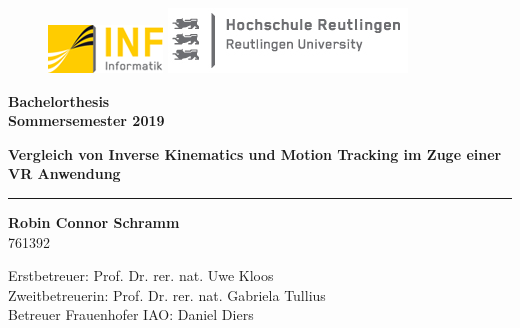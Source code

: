 \begin{titlepage}

\begin{center}

\begin{figure}
\begin{minipage}[H]{4cm}
\centering
\includegraphics[width=0.8\linewidth]{Bilder/Deckblatt/universityLogo}
\end{minipage}
\hfill
\begin{minipage}[H]{6cm}
\centering
\includegraphics[width=1\linewidth]{Bilder/Deckblatt/CompanyLogo}
\end{minipage}
\end{figure}

\vspace*{0.8cm}

{\large \textbf{Bachelorthesis\\}}
\vspace*{0.2cm}
{\textbf{Sommersemester 2019\\}}
\vspace*{0.4cm}
\vspace*{0.8cm}

\textbf{{\large {\Large Vergleich von Inverse Kinematics und Motion Tracking im Zuge einer VR Anwendung }}}\\

\noindent\rule{\textwidth}{2pt}
\vspace*{0.6cm}

{\large \textbf{Robin Connor Schramm\\}}
761392
\vspace*{0.6cm}

\vspace*{0.6cm}

Erstbetreuer: Prof. Dr. rer. nat. Uwe Kloos\\
Zweitbetreuerin: Prof. Dr. rer. nat. Gabriela Tullius\\
Betreuer Frauenhofer IAO: Daniel Diers
 

\end{center}

\end{titlepage}